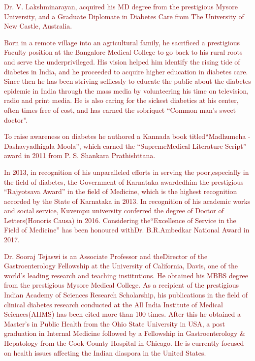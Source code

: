 \thispagestyle{empty}

{\small
{}

\textcolor{maroon}{Dr. V. Lakshminarayan, acquired his MD degree from the prestigious Mysore University, and a Graduate Diplomate in Diabetes Care from The University of New Castle, Australia.}

\textcolor{maroon}{Born in a remote village into an agricultural family, he sacrificed a prestigious Faculty position at the Bangalore Medical College to go back to his rural roots and serve the underprivileged. His vision helped him identify the rising tide of diabetes in India, and he proceeded to acquire higher education in diabetes care. Since then he has been striving selflessly to educate the public about the diabetes epidemic in India through the mass media by volunteering his time on television, radio and print media. He is also caring for the sickest diabetics at his center, often times free of cost, and has earned the sobriquet “Common man’s sweet doctor”.}

\textcolor{maroon}{To raise awareness on diabetes he authored a Kannada book titled\break “Madhumeha - Dashavyadhigala Moola”, which earned the “Supreme\break Medical Literature Script” award in 2011 from P. S. Shankara Prathishttana.}

\textcolor{maroon}{In 2013, in recognition of his unparalleled efforts in serving the poor,\break especially in the field of diabetes, the Government of Karnataka awarded\break him the prestigious “Rajyotsava Award” in the field of Medicine, which is the highest recognition accorded by the State of Karnataka in 2013. In recogni\-tion of his academic works and social service, Kuvempu university conferred the degree of Doctor of Letters(Honoris Causa) in 2016. Considering the\break “Excellence of Service in the Field of Medicine” has been honoured with\break Dr. B.R.Ambedkar National Award in 2017.}


\textcolor{maroon}{Dr. Sooraj Tejaswi is an Associate Professor and the\break Director of the Gastroenterology Fellowship at the University of California, Davis, one of the world’s leading research and teaching institutions. He obtained his MBBS degree from the prestigious Mysore Medical College. As a recipient of the prestigious Indian Academy of Sciences Research Scholarship, his publications in the field of clinical diabetes research conducted at the All India Institute of Medical Sciences\break (AIIMS) has been cited more than 100 times. After this he obtained a Master’s in Public Health from the Ohio State University in USA, a post graduation in Internal Medicine followed by a Fellowship in Gastroenterology \& Hepatology from the Cook County Hospital in Chicago. He is currently focused on health issues affecting the Indian diaspora in the United States.}

}
